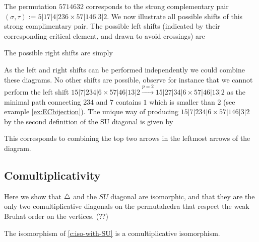 \begin{example} \label{ex:shifts}
The permutation $5714632$ corresponds to the strong complementary pair $(\sigma,\tau) := 5|17|4|236 \times 57|146|3|2$. We now illustrate all possible shifts of this strong complimentary pair. The possible left shifts (indicated by their corresponding critical element, and drawn to avoid crossings) are
\begin{center}
\end{center}
The possible right shifts are simply
\begin{center}
\end{center}
As the left and right shifts can be performed independently we could combine these diagrams.
No other shifts are possible, observe for instance that we cannot perform the left shift $15|7|234|6 \times 57|46|13|2 \xrightarrow{p=2} 15|27|34|6 \times 57|46|13|2$ as the minimal path connecting $234$ and $7$ contains $1$ which is smaller than $2$ (see example \ref{ex:ECbijection}). The unique way of producing $15|7|234|6 \times 57|146|3|2$ by the second definition of the SU diagonal is given by
\begin{center}
\end{center}
This corresponds to combining the top two arrows in the leftmost arrows of the diagram.
\end{example}


\subsection{Comultiplicativity}


Here we show that $\triangle$ and the $SU$ diagonal are isomorphic, and that they are the only two comultiplicative diagonals on the permutahedra that respect the weak Bruhat order on the vertices. (??)

The isomorphism of \cref{c:iso-with-SU} is a comultiplicative isomorphism.